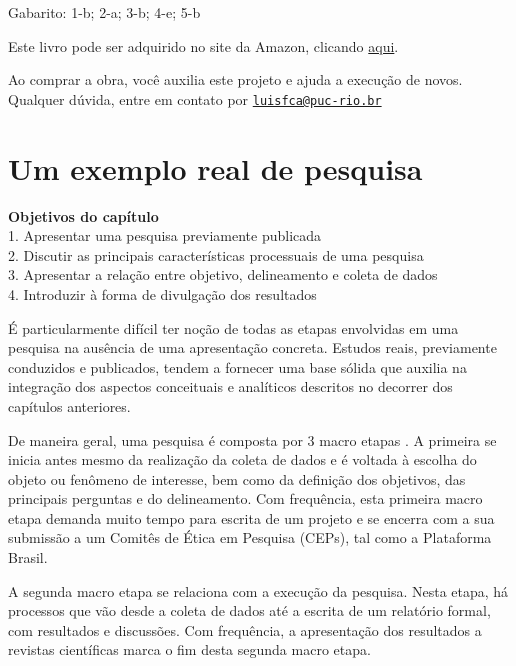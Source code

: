 \documentclass[
]{book}
\newenvironment{objectives}{
  \definecolor{shadecolor}{rgb}{0, 0, 0}  %
  \color{white}
  \begin{shaded}}
 {\end{shaded}}
\begin{document}
Gabarito: 1-b; 2-a; 3-b; 4-e; 5-b

Este livro pode ser adquirido no site da Amazon, clicando \href{https://www.amazon.com.br/gp/product/B097CP7T9M?pf_rd_r=RDZC8XYMBC1WY69T0J8K\&pf_rd_p=abb22e6b-8812-4b76-a424-5f0b098d2c90\&pd_rd_r=ceec1911-f409-4acd-ac8f-2d5bc68dac43\&pd_rd_w=wMUzJ\&pd_rd_wg=ZK85a\&ref_=pd_gw_unk}{aqui}.

Ao comprar a obra, você auxilia este projeto e ajuda a execução de novos. Qualquer dúvida, entre em contato por \href{mailto:luisfca@puc-rio.br}{\nolinkurl{luisfca@puc-rio.br}}

\hypertarget{um-exemplo-real-de-pesquisa}{%
\chapter{Um exemplo real de pesquisa}\label{um-exemplo-real-de-pesquisa}}

\begin{objectives}
\textbf{Objetivos do capítulo}\\
1. Apresentar uma pesquisa previamente publicada\\
2. Discutir as principais características processuais de uma pesquisa\\
3. Apresentar a relação entre objetivo, delineamento e coleta de dados\\
4. Introduzir à forma de divulgação dos resultados

\end{objectives}

É particularmente difícil ter noção de todas as etapas envolvidas em uma pesquisa na ausência de uma apresentação concreta. Estudos reais, previamente conduzidos e publicados, tendem a fornecer uma base sólida que auxilia na integração dos aspectos conceituais e analíticos descritos no decorrer dos capítulos anteriores.

De maneira geral, uma pesquisa é composta por 3 macro etapas \citep{Mayer2007}. A primeira se inicia antes mesmo da realização da coleta de dados e é voltada à escolha do objeto ou fenômeno de interesse, bem como da definição dos objetivos, das principais perguntas e do delineamento. Com frequência, esta primeira macro etapa demanda muito tempo para escrita de um projeto e se encerra com a sua submissão a um Comitês de Ética em Pesquisa (CEPs), tal como a Plataforma Brasil.

A segunda macro etapa se relaciona com a execução da pesquisa. Nesta etapa, há processos que vão desde a coleta de dados até a escrita de um relatório formal, com resultados e discussões. Com frequência, a apresentação dos resultados a revistas científicas marca o fim desta segunda macro etapa.
\end{document}
